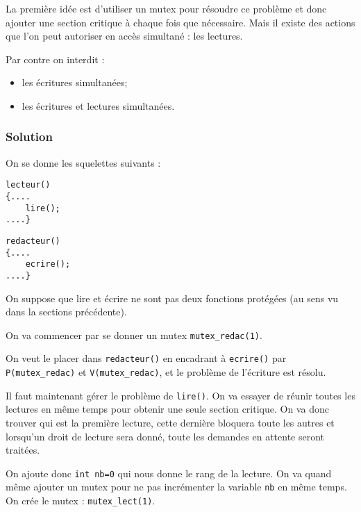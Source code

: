 \documentclass[12pt,a4paper]{report}
\begin{document}
\medskip

La première idée est d'utiliser un mutex pour résoudre ce problème et donc ajouter une section critique à chaque fois que nécessaire.
Mais il existe des actions que l'on peut autoriser en accès simultané : les lectures.

Par contre on interdit :
\begin{itemize}
\item les écritures simultanées;
\item les écritures et lectures simultanées.
\end{itemize}

\subsubsection{Solution}
\label{sec:solution}

On se donne les squelettes suivants :

\medskip

\begin{minipage}{0.5\linewidth}
\begin{verbatim}
lecteur()
{....
    lire();
....}
\end{verbatim}
\end{minipage}
\begin{minipage}{0.5\linewidth}
\begin{verbatim}
redacteur()
{....
    ecrire();
....}
\end{verbatim}
\end{minipage}

\medskip

On suppose que lire et écrire ne sont pas deux fonctions protégées (au sens vu dans la sections précédente).

\bigskip

On va commencer par se donner un mutex \verb?mutex_redac(1)?.

On veut le placer dans \verb?redacteur()? en encadrant à \verb?ecrire()? par \verb?P(mutex_redac)? et \verb?V(mutex_redac)?, et le problème de l'écriture est résolu.

Il faut maintenant gérer le problème de \verb?lire()?. On va essayer de réunir toutes les lectures en même temps pour obtenir \og une seule section critique\fg{}. On va donc trouver qui est la première lecture, cette dernière bloquera toute les autres et lorsqu'un droit de lecture sera donné, toute les demandes en attente seront traitées.

On ajoute donc \verb?int nb=0? qui nous donne le rang de la lecture. On va quand même ajouter un mutex pour ne pas incrémenter la variable \verb?nb? en même temps. On crée le mutex : \verb?mutex_lect(1)?.
\end{document}
